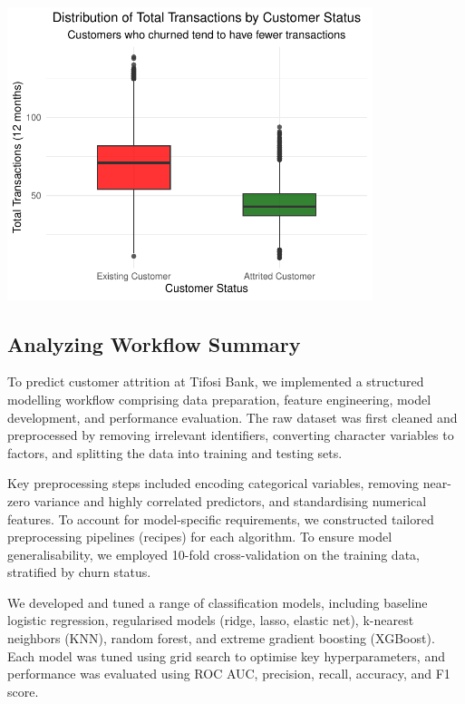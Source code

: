 \documentclass[
  letterpaper,
  DIV=11,
  numbers=noendperiod]{scrartcl}
\begin{document}
\begin{center}
\includegraphics[width=0.8\textwidth,height=\textheight]{v4_files/figure-pdf/unnamed-chunk-15-1.pdf}
\end{center}

\subsection{Analyzing Workflow
Summary}\label{analyzing-workflow-summary}

To predict customer attrition at Tifosi Bank, we implemented a
structured modelling workflow comprising data preparation, feature
engineering, model development, and performance evaluation. The raw
dataset was first cleaned and preprocessed by removing irrelevant
identifiers, converting character variables to factors, and splitting
the data into training and testing sets.

Key preprocessing steps included encoding categorical variables,
removing near-zero variance and highly correlated predictors, and
standardising numerical features. To account for model-specific
requirements, we constructed tailored preprocessing pipelines (recipes)
for each algorithm. To ensure model generalisability, we employed
10-fold cross-validation on the training data, stratified by churn
status.

We developed and tuned a range of classification models, including
baseline logistic regression, regularised models (ridge, lasso, elastic
net), k-nearest neighbors (KNN), random forest, and extreme gradient
boosting (XGBoost). Each model was tuned using grid search to optimise
key hyperparameters, and performance was evaluated using ROC AUC,
precision, recall, accuracy, and F1 score.
\end{document}
